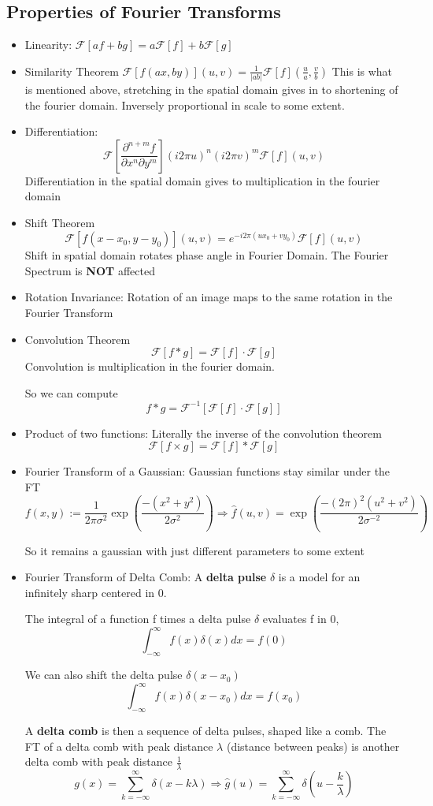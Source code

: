 \documentclass{article}
\begin{document}
\subsection{Properties of Fourier Transforms}
\begin{itemize}
  \item Linearity: $\mathcal{F}[af + bg] = a\mathcal{F}[f] + b\mathcal{F}[g]$
  \item Similarity Theorem $\mathcal{F}[f(ax,by)](u,v) = \frac{1}{|ab|}\mathcal{F}[f](\frac{u}{a},\frac{v}{b})$ This is what is mentioned above, stretching in the spatial domain gives in to shortening of the fourier domain. Inversely proportional in scale to some extent.
  \item Differentiation: 
  \[\mathcal{F}\left[\frac{\partial^{n+m}f}{\partial x^n\partial y^m}\right] (i2\pi u)^n(i2\pi v)^m \mathcal{F}[f](u,v)\]
  Differentiation in the spatial domain gives to multiplication in the fourier domain
  \item Shift Theorem
  \[\mathcal{F}[f(x-x_0,y-y_0)](u,v) = e^{-i2\pi(ux_0 + vy_0)}\mathcal{F}[f](u,v)\]
  Shift in spatial domain rotates phase angle in Fourier Domain. The Fourier Spectrum is \textbf{NOT} affected
  \item Rotation Invariance: Rotation of an image maps to the same rotation in the Fourier Transform
  \item Convolution Theorem 
  \[\mathcal{F}[f \ast g] = \mathcal{F}[f]\cdot \mathcal{F}[g]\]
  Convolution is multiplication in the fourier domain.

  So we can compute
  \[f\ast g = \mathcal{F}^{-1}[\mathcal{F}[f]\cdot\mathcal{F}[g]]\]
  \item Product of two functions: Literally the inverse of the convolution theorem
  \[\mathcal{F}[f\times g] = \mathcal{F}[f] \ast \mathcal{F}[g]\]
  \item Fourier Transform of a Gaussian: Gaussian functions stay similar under the FT
  \[f(x,y) := \frac{1}{2\pi\sigma^2}\exp\left(\frac{-(x^2+y^2)}{2\sigma^2}\right) \Rightarrow \hat{f}(u,v) = \exp\left(\frac{-(2\pi)^2(u^2+v^2)}{2\sigma^{-2}}\right)\]

  So it remains a gaussian with just  different parameters to some extent

  \item Fourier Transform of Delta Comb: A \textbf{delta pulse} $\delta$ is a model for an infinitely sharp centered in 0.

  The integral of a function f times a delta pulse $\delta$ evaluates f in 0,
  \[\int_{-\infty}^{\infty}f(x)\delta(x)dx = f(0)\]

  We can also shift the delta pulse $\delta(x-x_0)$
  \[\int_{-\infty}^{\infty}f(x)\delta(x-x_0)dx = f(x_0)\]

  A \textbf{delta comb} is then a sequence of delta pulses, shaped like a comb.
  The FT of a delta comb with peak distance $\lambda$ (distance between peaks) is another delta comb with peak distance $\frac{1}{\lambda}$
  \[g(x) = \sum_{k=-\infty}^{\infty}\delta(x-k\lambda) \Rightarrow \hat{g}(u) = \sum_{k=-\infty}^{\infty}\delta\left(u - \frac{k}{\lambda}\right)\]
\end{itemize}
\end{document}
